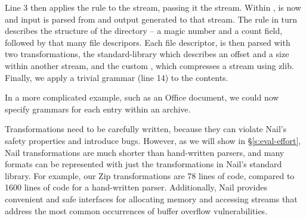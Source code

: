 Line 3 then applies the  rule to  the  stream, passing it the 
stream. Within ,  is now  and input is parsed from and output
generated to that stream. The  rule in turn describes the structure of the directory -- a
magic number and a count field, followed by that many file descripors. Each file descriptor, is then parsed with two
transformations, the standard-library  which describes an offset and a size within another
stream, and the custom , which compresses a stream using zlib. Finally, we apply a trivial
grammar (line 14) to the contents. 

In a more complicated example, such as an Office document, we could now specify grammars for each
entry within an archive.


 

Transformations need to be carefully written, because they can violate Nail's safety properties
and introduce
bugs. However, as we will show in \S\ref{s:eval-effort}, Nail transformations are much shorter than
hand-written parsers, and many formats can be represented with just the transformations in Nail's
standard library.
For example, our Zip transformations are 78 lines of code, compared to 1600 lines of code for a
   hand-written parser. Additionally, Nail provides convenient and safe interfaces for allocating
   memory and accessing streams that address the most common occurrences of buffer overflow
   vulnerabilities.  







